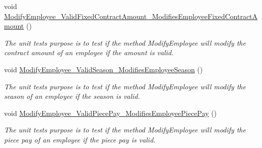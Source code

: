 \begin{DoxyCompactItemize}
void \hyperlink{class_the_company_1_1_tests_1_1_modify_employee_tests_a8c9493efb160a306c00673ae79fce155}{Modify\+Employee\+\_\+\+Valid\+Fixed\+Contract\+Amount\+\_\+\+Modifies\+Employee\+Fixed\+Contract\+Amount} ()
\begin{DoxyCompactList}\small\item\em The unit test\textquotesingle{}s purpose is to test if the method Modify\+Employee will modify the contract amount of an employee if the amount is valid. \end{DoxyCompactList}\item 
void \hyperlink{class_the_company_1_1_tests_1_1_modify_employee_tests_af941e201a01abc2ebc45db1a1f2c8c36}{Modify\+Employee\+\_\+\+Valid\+Season\+\_\+\+Modifies\+Employee\+Season} ()
\begin{DoxyCompactList}\small\item\em The unit test\textquotesingle{}s purpose is to test if the method Modify\+Employee will modify the season of an employee if the season is valid. \end{DoxyCompactList}\item 
void \hyperlink{class_the_company_1_1_tests_1_1_modify_employee_tests_a3175777cab64164f9e0ea5d99b3705f0}{Modify\+Employee\+\_\+\+Valid\+Piece\+Pay\+\_\+\+Modifies\+Employee\+Piece\+Pay} ()
\begin{DoxyCompactList}\small\item\em The unit test\textquotesingle{}s purpose is to test if the method Modify\+Employee will modify the piece pay of an employee if the piece pay is valid. \end{DoxyCompactList}\end{DoxyCompactItemize}

